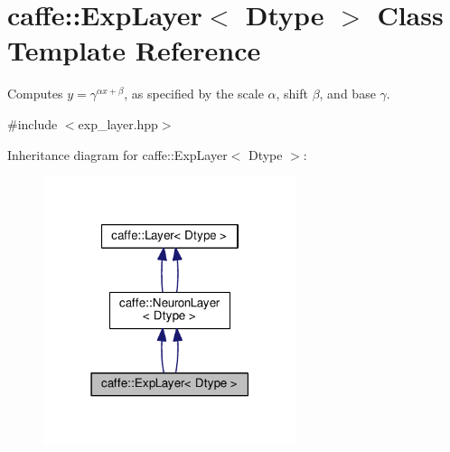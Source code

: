 \hypertarget{classcaffe_1_1_exp_layer}{}\section{caffe\+:\+:Exp\+Layer$<$ Dtype $>$ Class Template Reference}
\label{classcaffe_1_1_exp_layer}


Computes $ y = \gamma ^ {\alpha x + \beta} $, as specified by the scale $ \alpha $, shift $ \beta $, and base $ \gamma $.  




{\ttfamily \#include $<$exp\+\_\+layer.\+hpp$>$}



Inheritance diagram for caffe\+:\+:Exp\+Layer$<$ Dtype $>$\+:
\nopagebreak
\begin{figure}[H]
\begin{center}
\leavevmode
\includegraphics[width=210pt]{classcaffe_1_1_exp_layer__inherit__graph}
\end{center}
\end{figure}
